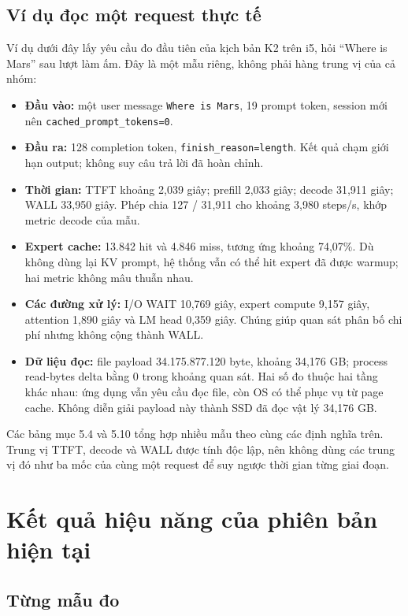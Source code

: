\subsection{Ví dụ đọc một request thực tế}

Ví dụ dưới đây lấy yêu cầu đo đầu tiên của kịch bản K2 trên i5, hỏi “Where is Mars” sau lượt làm ấm. Đây là một mẫu riêng, không phải hàng trung vị của cả nhóm:

\begin{itemize}
\item \textbf{Đầu vào:} một user message \texttt{Where is Mars}, 19 prompt token, session mới nên \nolinkurl{cached_prompt_tokens=0}.
\item \textbf{Đầu ra:} 128 completion token, \nolinkurl{finish_reason=length}. Kết quả chạm giới hạn output; không suy câu trả lời đã hoàn chỉnh.
\item \textbf{Thời gian:} TTFT khoảng 2,039 giây; prefill 2,033 giây; decode 31,911 giây; WALL 33,950 giây. Phép chia 127 / 31,911 cho khoảng 3,980 steps/s, khớp metric decode của mẫu.
\item \textbf{Expert cache:} 13.842 hit và 4.846 miss, tương ứng khoảng 74,07\%. Dù không dùng lại KV prompt, hệ thống vẫn có thể hit expert đã được warmup; hai metric không mâu thuẫn nhau.
\item \textbf{Các đường xử lý:} I/O WAIT 10,769 giây, expert compute 9,157 giây, attention 1,890 giây và LM head 0,359 giây. Chúng giúp quan sát phân bố chi phí nhưng không cộng thành WALL.
\item \textbf{Dữ liệu đọc:} file payload 34.175.877.120 byte, khoảng 34,176 GB; process read-bytes delta bằng 0 trong khoảng quan sát. Hai số đo thuộc hai tầng khác nhau: ứng dụng vẫn yêu cầu đọc file, còn OS có thể phục vụ từ page cache. Không diễn giải payload này thành SSD đã đọc vật lý 34,176 GB.
\end{itemize}

Các bảng mục 5.4 và 5.10 tổng hợp nhiều mẫu theo cùng các định nghĩa trên. Trung vị TTFT, decode và WALL được tính độc lập, nên không dùng các trung vị đó như ba mốc của cùng một request để suy ngược thời gian từng giai đoạn.

\section{Kết quả hiệu năng của phiên bản hiện tại}

\subsection{Từng mẫu đo}

